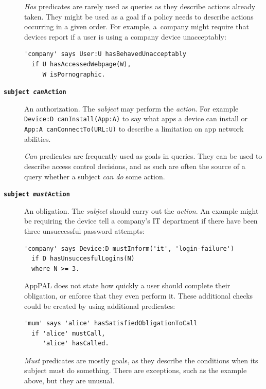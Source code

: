 \documentclass[thesis.tex]{subfiles}
\begin{document}
\begin{description}
  \emph{Has} predicates are rarely used as queries as they describe actions
  already taken.  They might be used as a goal if a policy needs to describe
  actions occurring in a given order.  For example, a~company might require that
  devices report if a user is using a company device unacceptably:

  \begin{lstlisting}
'company' says User:U hasBehavedUnacceptably
  if U hasAccessedWebpage(W),
     W isPornographic.
  \end{lstlisting}

\item[\bfseries\texttt{subject \emph{can}Action}]
  An authorization.
  The \emph{subject} may perform the \emph{action}.
  For example \lstinline!Device:D canInstall(App:A)! to say what apps a device can install or \lstinline!App:A canConnectTo(URL:U)! to describe a limitation on app network abilities.

  \emph{Can} predicates are frequently used as goals in queries.  They can be
  used to describe access control decisions, and as such are often the source of
  a query whether a subject \emph{can do} some action.

\item[\bfseries\texttt{subject \emph{must}Action}]
  An obligation.  The \emph{subject} should carry out the \emph{action}.
  An example might be requiring the device tell a company's IT department if there have been three unsuccessful password attempts:

  \begin{minipage}{\linewidth}
  \begin{lstlisting}
'company' says Device:D mustInform('it', 'login-failure')
  if D hasUnsuccesfulLogins(N)
  where N >= 3.
  \end{lstlisting}
  \end{minipage}

  AppPAL does not state how quickly a user should complete their obligation, or
  enforce that they even perform it.  These additional checks could be created
  by using additional predicates:

  \begin{lstlisting}
'mum' says 'alice' hasSatisfiedObligationToCall
  if 'alice' mustCall,
     'alice' hasCalled.
  \end{lstlisting}

  \emph{Must} predicates are mostly goals, as they describe the conditions when
  its subject must do something.  There are exceptions, such as the example
  above, but they are unusual.
\end{description}
\end{document}
